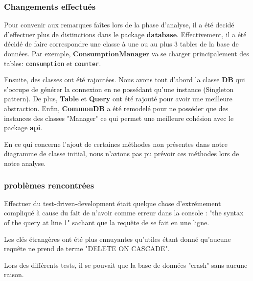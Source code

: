 \subsubsection{Changements effectués}
\begin{flushleft}
    Pour convenir aux remarques faîtes lors de la phase d'analyse, il a été decidé d'effectuer plus de distinctions dans le package $\mathbf{database}$. Effectivement, il a été décidé de faire correspondre une classe à une ou au plus 3 tables de la base de données. Par exemple, $\mathbf{ConsumptionManager}$ va se charger principalement des tables: \texttt{consumption} et \texttt{counter}.
\end{flushleft}
\begin{flushleft}
    Ensuite, des classes ont été rajoutées. Nous avons tout d'abord la classe \textbf{DB} qui s'occupe de générer la connexion en ne possédant qu'une instance (Singleton pattern). De plus, \textbf{Table} et \textbf{Query} ont été rajouté pour avoir une meilleure abstraction. Enfin, \textbf{CommonDB} a été remodelé pour ne posséder que des instances des classes "Manager" ce qui permet une meilleure cohésion avec le package \textbf{api}.
\end{flushleft}
\begin{flushleft}
    En ce qui concerne l'ajout de certaines méthodes non présentes dans notre diagramme de classe initial, nous n'avions pas pu prévoir ces méthodes lors de notre analyse.
\end{flushleft}

\subsubsection{problèmes rencontrées}
\begin{flushleft}
    Effectuer du test-driven-development était quelque chose d'extrémement compliqué à cause du fait de n'avoir comme erreur dans la console : "the syntax of the query at line 1" sachant que la requête de se fait en une ligne. 
\end{flushleft}
\begin{flushleft}
    Les clés étrangères ont été plus ennuyantes qu'utiles étant donné qu'aucune requête ne prend de terme "DELETE ON CASCADE".
\end{flushleft}
\begin{flushleft}
    Lors des différents tests, il se pouvait que la base de données "crash" sans aucune raison.
\end{flushleft}

